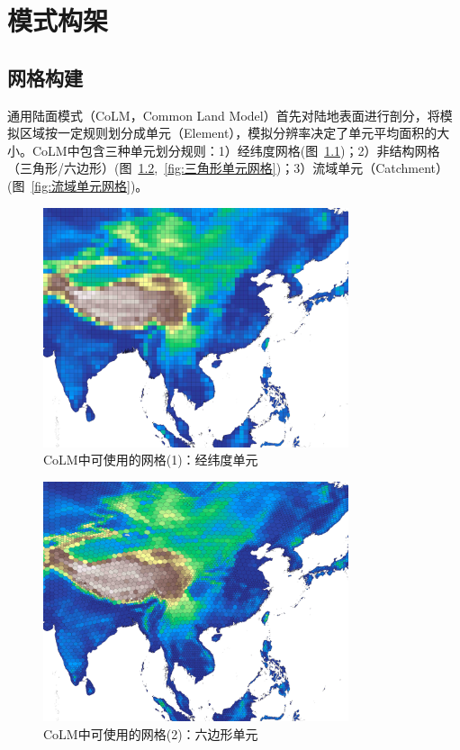 \chapter{模式构架}\label{模式构架}
\section{网格构建}\label{网格构建}

通用陆面模式（CoLM，Common Land Model）首先对陆地表面进行剖分，将模拟区域按一定规则划分成单元（Element），模拟分辨率决定了单元平均面积的大小。CoLM中包含三种单元划分规则：1）经纬度网格(图~\ref{fig:经纬度网格})；2）非结构网格（三角形/六边形）(图~\ref{fig:六边形单元网格},~\ref{fig:三角形单元网格})；3）流域单元（Catchment）(图~\ref{fig:流域单元网格})。

 {
\begin{figure}[htbp]
\centering
\includegraphics[width=0.8\textwidth]{CoLM-Latex/Figures/模式构架/网格-格点.jpg}
\caption{CoLM中可使用的网格(1)：经纬度单元}
\label{fig:经纬度网格}
\end{figure}
}
 {
\begin{figure}[htbp]
\centering
\includegraphics[width=0.8\textwidth]{Figures/模式构架/网格-六边形.jpg}
\caption{CoLM中可使用的网格(2)：六边形单元}
\label{fig:六边形单元网格}
\end{figure}
}
